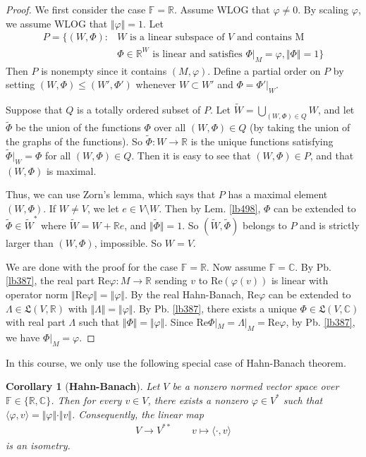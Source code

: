 \documentclass[12pt,b5paper,notitlepage]{article}
\theoremstyle{definition}
\theoremstyle{plain}
\newtheorem{co}[df]{Corollary}
\newcommand{\fk}{\mathfrak}
\newcommand{\wtd}{\widetilde}
\newcommand{\bk}[1]{\langle {#1}\rangle}
\newcommand{\Cbb}{\mathbb C}
\newcommand{\Rbb}{\mathbb R}
\newcommand{\Real}{\mathrm{Re}}
\newcommand{\Fbb}{\mathbb F}
\numberwithin{equation}{section}
\begin{document}
\begin{proof}
We first consider the case $\Fbb=\Rbb$. Assume WLOG that $\varphi\neq 0$. By scaling $\varphi$, we assume WLOG that $\Vert\varphi\Vert=1$. Let
\begin{align*}
P=\big\{(W,\Phi):&W\text{ is a linear subspace of }V\text{ and contains M}\\
&\Phi\in\Rbb^W\text{ is linear and satisfies }\Phi|_M=\varphi,\Vert\Phi\Vert=1\big\}
\end{align*}
Then $P$ is nonempty since it contains $(M,\varphi)$. Define a partial order on $P$ by setting $(W,\Phi)\leq(W',\Phi')$ whenever $W\subset W'$ and $\Phi=\Phi'|_W$.

Suppose that $Q$ is a totally ordered subset of $P$. Let $\wtd W=\bigcup_{(W,\Phi)\in Q}W$, and let $\wtd\Phi$ be the union of the functions $\Phi$ over all $(W,\Phi)\in Q$ (by taking the union of the graphs of the functions). So $\wtd\Phi:W\rightarrow\Rbb$ is the unique functions satisfying $\wtd \Phi|_W=\Phi$ for all $(W,\Phi)\in Q$. Then it is easy to see that $(W,\Phi)\in P$, and that $(W,\Phi)$ is maximal.

Thus, we can use Zorn's lemma, which says that $P$ has a maximal element $(W,\Phi)$. If $W\neq V$, we let $e\in V\setminus W$. Then by Lem. \ref{lb498}, $\Phi$ can be extended to $\wtd\Phi\in \wtd W^*$ where $\wtd W=W+\Rbb e$, and $\Vert\wtd\Phi\Vert=1$. So $(\wtd W,\wtd\Phi)$ belongs to $P$ and is strictly larger than $(W,\Phi)$, impossible. So $W=V$.

We are done with the proof for the case $\Fbb=\Rbb$. Now assume $\Fbb=\Cbb$. By Pb. \ref{lb387}, the real part $\Real\varphi:M\rightarrow\Rbb$ sending $v$ to $\Real(\varphi(v))$ is linear with operator norm $\Vert\Real\varphi\Vert=\Vert\varphi\Vert$. By the real Hahn-Banach, $\Real\varphi$ can be extended to $\Lambda\in\fk L(V,\Rbb)$ with $\Vert\Lambda\Vert=\Vert\varphi\Vert$. By Pb. \ref{lb387}, there exists a unique $\Phi\in\fk L(V,\Cbb)$ with real part $\Lambda$ such that $\Vert\Phi\Vert=\Vert\varphi\Vert$. Since $\Real\Phi|_M=\Lambda|_M=\Real \varphi$, by Pb. \ref{lb387}, we have $\Phi|_M=\varphi$.
\end{proof}



In this course, we only use the following special case of Hahn-Banach theorem.

\begin{co}[\textbf{Hahn-Banach}]\label{lb502}
Let $V$ be a nonzero normed vector space over $\Fbb\in\{\Rbb,\Cbb\}$. Then for  every $v\in V$, there exists a nonzero $\varphi\in V^*$ such that $\bk{\varphi,v}=\Vert\varphi\Vert\cdot\Vert v\Vert$. Consequently, the linear map
\begin{align}\label{eq202}
V\rightarrow V^{**}\qquad v\mapsto \bk{\cdot,v}
\end{align}
is an isometry.
\end{co}
\end{document}
